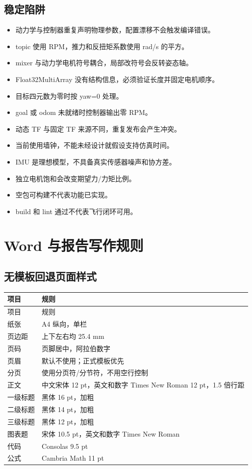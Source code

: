 \documentclass[UTF8,a4paper,12pt,fontset=fandol]{ctexart}
\begin{document}
\subsection{稳定陷阱}

\begin{itemize}
  \item 动力学与控制器重复声明物理参数，配置漂移不会触发编译错误。
  \item topic 使用 RPM，推力和反扭矩系数使用 rad/s 的平方。
  \item mixer 与动力学电机符号耦合，局部改符号会反转姿态轴。
  \item Float32MultiArray 没有结构信息，必须验证长度并固定电机顺序。
  \item 目标四元数为零时按 yaw=0 处理。
  \item goal 或 odom 未就绪时控制器输出零 RPM。
  \item 动态 TF 与固定 TF 来源不同，重复发布会产生冲突。
  \item 当前使用墙钟，不能未经设计就假设支持仿真时间。
  \item IMU 是理想模型，不具备真实传感器噪声和协方差。
  \item 独立电机饱和会改变期望力/力矩比例。
  \item 空包可构建不代表功能已实现。
  \item build 和 lint 通过不代表飞行闭环可用。
\end{itemize}

\section{Word 与报告写作规则}

\subsection{无模板回退页面样式}

\begin{longtable}{p{}p{}}
\toprule
项目 & 规则 \\
\midrule
\endfirsthead
\toprule
项目 & 规则 \\
\midrule
\endhead
纸张 & A4 纵向，单栏 \\
页边距 & 上下左右均 25.4 mm \\
页码 & 页脚居中，阿拉伯数字 \\
页眉 & 默认不使用；正式模板优先 \\
分页 & 使用分页符/分节符，不用空行控制 \\
正文 & 中文宋体 12 pt，英文和数字 Times New Roman 12 pt，1.5 倍行距 \\
一级标题 & 黑体 16 pt，加粗 \\
二级标题 & 黑体 14 pt，加粗 \\
三级标题 & 黑体 12 pt，加粗 \\
图表题 & 宋体 10.5 pt，英文和数字 Times New Roman \\
代码 & Consolas 9.5 pt \\
公式 & Cambria Math 11 pt \\
\bottomrule
\end{longtable}
\end{document}
